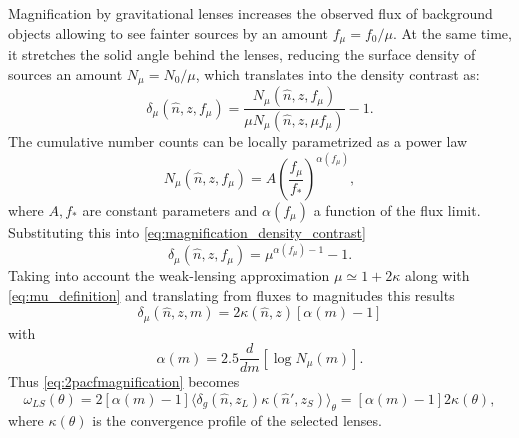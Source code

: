 Magnification by gravitational lenses increases the observed flux of background objects  allowing to see fainter sources by an amount $f_\mu = f_0/\mu$. At the same time, it stretches the solid angle behind the lenses, reducing the surface density of sources an amount $N_\mu = N_0/\mu$, which translates into the density contrast as:
\begin{equation}
\delta_\mu(\hat n,z,f_\mu) = \frac{N_\mu(\hat n,z,f_\mu)}{\mu N_\mu(\hat n,z,\mu f_\mu)}-1.
\label{eq:magnification_density_contrast}
\end{equation}
The cumulative number counts can be locally parametrized as a power law
\begin{equation}
N_\mu(\hat n,z,f_\mu) = A\left(\frac{f_\mu}{f_*}\right)^{\alpha(f_\mu)},
\end{equation}
where $A,f_*$ are constant parameters and $\alpha(f_\mu)$ a function of the flux limit. Substituting this into \autoref{eq:magnification_density_contrast}
\begin{equation}
\delta_\mu(\hat n,z,f_\mu) = \mu^{\alpha(f_\mu)-1}-1.
\end{equation}
Taking into account the weak-lensing approximation $\mu\simeq 1+2\kappa$ along with \autoref{eq:mu_definition} and translating from fluxes to magnitudes this results
\begin{equation}
\delta_\mu(\hat n,z,m) = 2\kappa(\hat n,z)[\alpha(m)-1]
\end{equation}
with
\begin{equation}
\alpha(m) = 2.5\frac{d}{dm}\left[\log N_\mu(m)\right].
\label{eq:alpha}
\end{equation}
Thus \autoref{eq:2pacfmagnification} becomes
\begin{equation}
\omega_{LS}(\theta) = 2[\alpha(m)-1]\langle\delta_g(\hat n,z_L)\kappa(\hat n',z_S)\rangle_\theta = [\alpha(m)-1]2\kappa(\theta),
\label{eq:kappa_nc}
\end{equation}
where $\kappa(\theta)$ is the convergence profile of the selected lenses.

